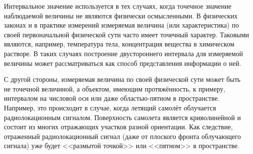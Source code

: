 \documentclass[a5paper,openany]{book}
\begin{document}
Интервальное значение используется в тех случаях, когда точечное значение наблюдаемой 
величины не являются физически осмысленными. В физических законах и в практике измерений 
измеряемая величина (или характеристика) по своей первоначальной физической сути часто 
имеет точечный характер. Таковыми являются, например, температура тела, концентрация 
вещества в химическом растворе. В таких случаях построение двустороннего интервала 
для измеряемой величины может рассматриваться как способ представления информации о ней. 
  
С другой стороны, измеряемая величина по своей физической сути может быть не точечной 
величиной, а объектом, имеющим протяжённость, к примеру, интервалом на числовой оси или 
даже областью-пятном в пространстве. Например, это происходит в случае, когда летящий 
самолёт облучается радиолокационным сигналом. Поверхность самолета является криволинейной 
и состоит из многих отражающих участков разной ориентации. Как следствие, отраженный 
радиолокационный сигнал (даже от плоского фронта облучающего сигнала) уже будет 
<<размытой точкой>> или <<пятном>> в пространстве. 
  
\end{document}
